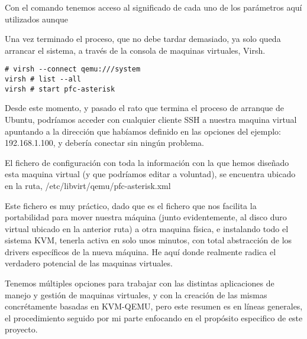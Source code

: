 Con el comando  tenemos acceso  al significado de cada uno de los parámetros aquí utilizados aunque 

Una vez terminado el proceso, que no debe tardar demasiado, ya solo queda arrancar el sistema, a través de la consola de maquinas virtuales, Virsh.

\begin{lstlisting}[style=consola]
# virsh --connect qemu:///system
virsh # list --all
virsh # start pfc-asterisk
\end{lstlisting}

Desde este momento, y pasado el rato que termina el proceso de arranque de Ubuntu, podríamos acceder con cualquier cliente SSH a nuestra maquina virtual apuntando a la dirección que habíamos definido en las opciones del ejemplo: 192.168.1.100, y debería conectar sin ningún problema. 

El fichero de configuración con toda la información con la que hemos diseñado esta maquina virtual (y que podríamos editar a voluntad), se encuentra ubicado en la ruta, /etc/libvirt/qemu/pfc-asterisk.xml

Este fichero es muy práctico, dado que es el fichero que nos facilita la portabilidad para mover nuestra máquina (junto evidentemente, al disco duro virtual ubicado en la anterior ruta) a otra maquina física, e instalando todo el sistema KVM, tenerla activa en solo unos minutos, con total abstracción de los drivers específicos de la nueva máquina. He aquí donde realmente radica el verdadero potencial de las maquinas virtuales.

Tenemos múltiples opciones para trabajar con las distintas aplicaciones de manejo y gestión de maquinas virtuales, y con la creación de las mismas concrétamente basadas en KVM-QEMU, pero este resumen es en líneas generales, el procedimiento seguido por mi parte enfocando en el propósito especifico de este proyecto.


